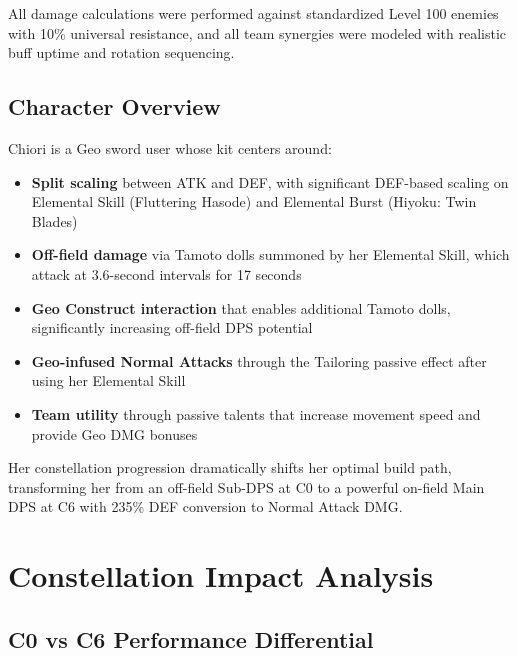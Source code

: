 \documentclass[12pt,a4paper]{article}
\begin{document}
All damage calculations were performed against standardized Level 100 enemies with 10\% universal resistance, and all team synergies were modeled with realistic buff uptime and rotation sequencing.

\subsection{Character Overview}

Chiori is a Geo sword user whose kit centers around:

\begin{itemize}
    \item \textbf{Split scaling} between ATK and DEF, with significant DEF-based scaling on Elemental Skill (Fluttering Hasode) and Elemental Burst (Hiyoku: Twin Blades)
    \item \textbf{Off-field damage} via Tamoto dolls summoned by her Elemental Skill, which attack at 3.6-second intervals for 17 seconds
    \item \textbf{Geo Construct interaction} that enables additional Tamoto dolls, significantly increasing off-field DPS potential
    \item \textbf{Geo-infused Normal Attacks} through the Tailoring passive effect after using her Elemental Skill
    \item \textbf{Team utility} through passive talents that increase movement speed and provide Geo DMG bonuses
\end{itemize}

Her constellation progression dramatically shifts her optimal build path, transforming her from an off-field Sub-DPS at C0 to a powerful on-field Main DPS at C6 with 235\% DEF conversion to Normal Attack DMG.

\section{Constellation Impact Analysis}

\subsection{C0 vs C6 Performance Differential}
\end{document}
